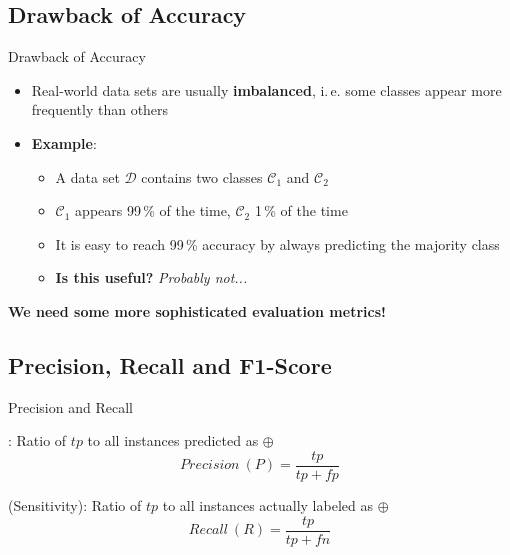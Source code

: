 \subsection{Drawback of Accuracy}

\begin{frame}{Drawback of Accuracy}{}
	\begin{itemize}
		\item Real-world data sets are usually \textbf{imbalanced}, i.\,e. some classes appear more frequently than others
		\item \textbf{Example}:
		\begin{itemize}
			\item A data set $\mathcal{D}$ contains two classes $\mathcal{C}_1$ and $\mathcal{C}_2$
			\item $\mathcal{C}_1$ appears 99\,\% of the time, $\mathcal{C}_2$ 1\,\% of the time
			\item It is easy to reach 99\,\% accuracy by always predicting the majority class
			\item \textbf{Is this useful?} \textit{Probably not...}
		\end{itemize}
	\end{itemize}
	
	\vspace*{2mm}
	\begin{boxBlueNoFrame}
		\textbf{We need some more sophisticated evaluation metrics!}
	\end{boxBlueNoFrame}
\end{frame}


\subsection{Precision, Recall and F1-Score}

\begin{frame}{Precision and Recall}{}\important
	\begin{boxBlueNoFrame}
		: Ratio of $tp$ to all instances predicted as $\oplus$
		\begin{equation}
			Precision\ (P) = \frac{tp}{tp + fp}
		\end{equation}
	\end{boxBlueNoFrame}

	\begin{boxBlueNoFrame}
		 (Sensitivity): Ratio of $tp$ to all instances actually labeled as $\oplus$
		\begin{equation}
			Recall\ (R) = \frac{tp}{tp + fn}
		\end{equation}
	\end{boxBlueNoFrame}
\end{frame}


